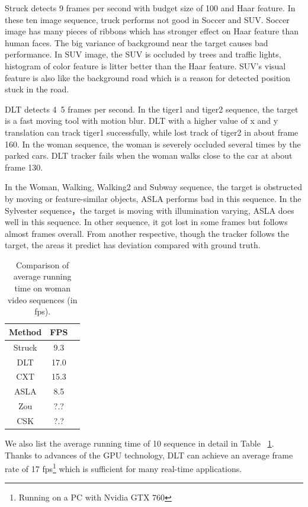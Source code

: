 \documentclass{acm_proc_article-sp}
\begin{document}
Struck detects 9 frames per second with budget size of 100 and Haar feature.
In these ten image sequence, truck performs not good in Soccer and SUV.
Soccer image has many pieces of ribbons which has stronger effect on Haar feature than human faces.
The big variance of background near the target causes bad performance.
In SUV image, the SUV is occluded by trees and traffic lights, histogram of color feature is litter better than the Haar feature.
SUV's visual feature is also like the background road which is a reason for detected position stuck in the road.

DLT detects 4~5 frames per second. In the tiger1 and tiger2 sequence, the target is a fast moving tool with motion blur. DLT with a higher value of x and y translation can track tiger1 successfully, while lost track of tiger2 in about frame 160. In the woman sequence, the woman is severely occluded several times by the parked cars. DLT tracker fails when the woman walks close to the car at about frame 130.

In the Woman, Walking, Walking2 and Subway sequence, the target is obstructed by moving or feature-similar objects, ASLA performs bad in this sequence. In the Sylvester sequence，the target is moving with illumination varying, ASLA does well in this sequence. In other sequence, it got lost in some frames but follows almost frames overall. From another respective,  though the tracker follows the target, the areas it predict has deviation compared with ground truth.

\begin{table}
	\centering
	\begin{tabular}{|c|c|l|} \hline
		Method & FPS\\ \hline
		Struck & 9.3\\ \hline
		DLT & 17.0\\ \hline
		CXT & 15.3\\ \hline
		ASLA & 8.5\\ \hline
		Zou & ?.?\\ \hline
		CSK & ?.?\\ \hline
	\end{tabular}
	\caption{Comparison of average running time on woman video sequences (in fps).}
	\label{table:time}
\end{table}

We also list the average running time of 10 sequence in detail in Table ~\ref{table:time}. Thanks to advances of the GPU technology, DLT can achieve an average frame rate of 17 fps\footnote{Running on a PC with Nvidia GTX 760} which is sufficient for many real-time applications.
\end{document}
